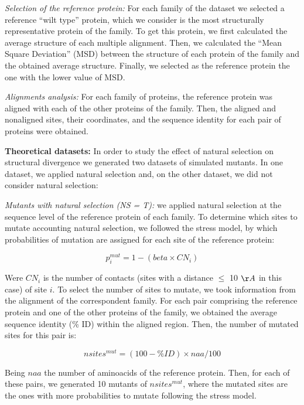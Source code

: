 \documentclass{article}
\begin{document}
\begin{multicols}{2}
{\it Selection of the reference protein:}
For each family of the dataset we selected a reference ``wilt type'' protein, which we consider is the most structurally representative protein of the family. To get this protein, we first calculated the average structure of each multiple alignment. Then, we calculated the ``Mean Square Deviation'' (MSD) between the structure of each protein of the family and the obtained average structure. Finally, we selected as the reference protein the one with the lower value of MSD.

{\it Alignments analysis:}
For each family of proteins, the reference protein was aligned with each of the other proteins of the family. Then, the aligned and nonaligned sites, their coordinates, and the sequence identity for each pair of proteins were obtained. 

{\bf Theoretical datasets:}
In order to study the effect of natural selection on structural divergence we generated two datasets of simulated mutants. In one dataset, we applied natural selection and, on the other dataset, we did not consider natural selection:

{\it Mutants with natural selection (NS = T):} we applied natural selection at the sequence level of the reference protein of each family. To determine which sites to mutate accounting natural selection, we followed the stress model, by which probabilities of mutation are assigned for each site of the reference protein:

\begin{equation}
p^{mut}_{i} = 1 - (beta \times CN_{i})
\end{equation}

Were $CN_{i}$ is the number of contacts (sites with a distance $\leq$ 10 $\AA$ in this case) of site $i$. 
To select the number of sites to mutate, we took information from the alignment of the correspondent family. For each pair comprising the reference protein and one of the other proteins of the family, we obtained the average sequence identity (\% ID) within the aligned region. Then, the number of mutated sites for this pair is: 

\begin{equation}
nsites^{mut} = (100 - \% ID) \times naa / 100
\end{equation}

Being $naa$ the number of aminoacids of the reference protein. 
Then, for each of these pairs, we generated 10 mutants of $nsites^{mut}$, where the mutated sites are the ones with more probabilities to mutate following the stress model.
 

\end{multicols}
\end{document}
